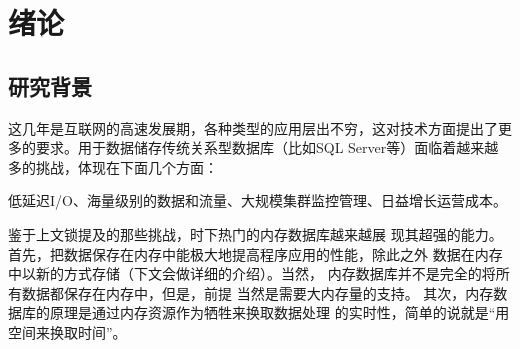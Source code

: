 \documentclass{zjutthesis}
\begin{document}



\frontmatter



\tableofcontents           %
\listoffigures             %
\listoftables              %


\mainmatter


\chapter{绪论}
\section{研究背景}
这几年是互联网的高速发展期，各种类型的应用层出不穷，这对技术方面提出了更多的要求。用于数据储存传统关系型数据库（比如SQL Server等）面临着越来越多的挑战，体现在下面几个方面：

低延迟I/O、海量级别的数据和流量、大规模集群监控管理、日益增长运营成本。

鉴于上文锁提及的那些挑战，时下热门的内存数据库越来越展
现其超强的能力。首先，把数据保存在内存中能极大地提高程序应用的性能，除此之外
数据在内存中以新的方式存储（下文会做详细的介绍）。当然，
内存数据库并不是完全的将所有数据都保存在内存中，但是，前提
当然是需要大内存量的支持。
其次，内存数据库的原理是通过内存资源作为牺牲来换取数据处理
的实时性，简单的说就是“用空间来换取时间”。
\end{document}
